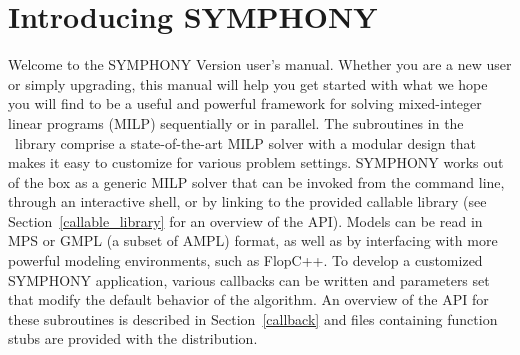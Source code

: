 
\section{Introducing SYMPHONY \VER}
\label{whats-new}

Welcome to the SYMPHONY Version \VER user's manual. Whether you are a new user
or simply upgrading, this manual will help you get started with what we hope
you will find to be a useful and powerful framework for solving mixed-integer
linear programs (MILP) sequentially or in parallel. The subroutines in the
\BB\ library comprise a state-of-the-art MILP solver with a modular design
that makes it easy to customize for various problem settings. SYMPHONY works
out of the box as a generic MILP solver that can be invoked from the command
line, through an interactive shell, or by linking to the provided callable
library (see Section~\ref{callable_library} for an overview of the API).
Models can be read in MPS or GMPL (a subset of AMPL) format, as well as by
interfacing with more powerful modeling environments, such as FlopC++. To
develop a customized SYMPHONY application, various callbacks can be written
and parameters set that modify the default behavior of the algorithm. An
overview of the API for these subroutines is described in
Section~\ref{callback} and files containing function stubs are provided with
the distribution.

